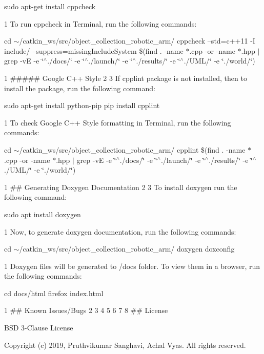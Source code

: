  sudo apt-\/get install cppcheck 
\begin{DoxyCode}
1 To run cppcheck in Terminal, run the following commands:
\end{DoxyCode}
 cd $\sim$/catkin\+\_\+ws/src/object\+\_\+collection\+\_\+robotic\+\_\+arm/ cppcheck --std=c++11 -\/I include/ --suppress=missing\+Include\+System \$(find . -\/name $\ast$.cpp -\/or -\/name $\ast$.hpp $\vert$ grep -\/vE -\/e \char`\"{}$^\wedge$./docs/\char`\"{} -\/e \char`\"{}$^\wedge$./launch/\char`\"{} -\/e \char`\"{}$^\wedge$./results/\char`\"{} -\/e \char`\"{}$^\wedge$./\+U\+M\+L/\char`\"{} -\/e \char`\"{}./world/\char`\"{}) 
\begin{DoxyCode}
1 ##### Google C++ Style
2 
3 If cpplint package is not installed, then to install the package, run the following command:
\end{DoxyCode}
 sudo apt-\/get install python-\/pip pip install cpplint 
\begin{DoxyCode}
1 To check Google C++ Style formatting in Terminal, run the following commands:
\end{DoxyCode}
 cd $\sim$/catkin\+\_\+ws/src/object\+\_\+collection\+\_\+robotic\+\_\+arm/ cpplint \$(find . -\/name $\ast$.cpp -\/or -\/name $\ast$.hpp $\vert$ grep -\/vE -\/e \char`\"{}$^\wedge$./docs/\char`\"{} -\/e \char`\"{}$^\wedge$./launch/\char`\"{} -\/e \char`\"{}$^\wedge$./results/\char`\"{} -\/e \char`\"{}$^\wedge$./\+U\+M\+L/\char`\"{} -\/e \char`\"{}./world/\char`\"{}) 
\begin{DoxyCode}
1 ## Generating Doxygen Documentation
2 
3 To install doxygen run the following command:
\end{DoxyCode}
 sudo apt install doxygen 
\begin{DoxyCode}
1 Now, to generate doxygen documentation, run the following commands:
\end{DoxyCode}
 cd $\sim$/catkin\+\_\+ws/src/object\+\_\+collection\+\_\+robotic\+\_\+arm/ doxygen doxconfig 
\begin{DoxyCode}
1 Doxygen files will be generated to /docs folder. To view them in a browser, run the following commands:
\end{DoxyCode}
 cd docs/html firefox index.\+html 
\begin{DoxyCode}
1 ## Known Issues/Bugs
2 
3 
4 
5 
6 
7 
8 ## License 
\end{DoxyCode}
 B\+SD 3-\/\+Clause License

Copyright (c) 2019, Pruthvikumar Sanghavi, Achal Vyas. All rights reserved.

